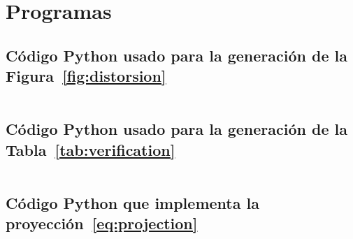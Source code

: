 \chapter{Programas}

\section{Código Python usado para la generación de la Figura~\ref{fig:distorsion}}

\begin{listing}[ht!]
	\tiny
	\centering
	\inputminted[frame=single,framesep=10pt,firstline=1,lastline=52,linenos]{python}{figura21.py}
	\caption{Código Python para calcular la distorsión promedio de
		$500$ pares de puntos de una distribución uniforme en $\left[0,1\right]^{d}$
		al proyectarlos a un subespacio de dimensión $k=4295$ cuando $d=100000$.}
\end{listing}

\section{Código Python usado para la generación de la Tabla~\ref{tab:verification}}

\begin{listing}[ht!]
	\tiny
	\centering
	\inputminted[frame=single,framesep=10pt,linenos]{python}{tabla51.py}
	\caption{Código Python para estimar la probabilidad del
		Teorema~\ref{thm:johnson-lindenstrauss} para distintos valores de
		$\varepsilon$ y dimensiones de proyección $k$.}
\end{listing}

\newpage

\section{Código Python que implementa la proyección~\eqref{eq:projection}}\label{sec:projection}

\begin{listing}[ht!]
	\tiny
	\centering
	\inputminted[frame=single,framesep=10pt,linenos]{python}{johnson.py}
	\caption{Código Python que implementa la proyección de Johnson-Lindenstrauss $T_{U\left(\omega\right)}$ para $d$ pequeño y $k$ en~\ref{lst:results3a}.}
\end{listing}
